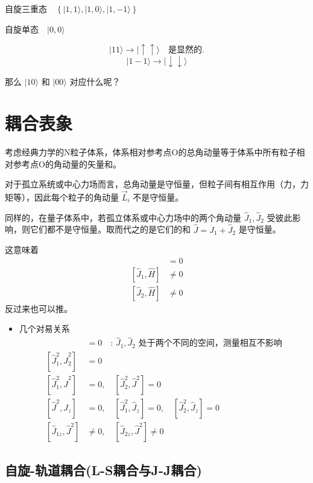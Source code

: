 \documentclass[lang=cn,10pt]{elegantbook}
\begin{document}
$\text{自旋三重态} \quad \left\{ |1, 1\rangle, |1, 0\rangle, |1, -1\rangle \right\}$

$\text{自旋单态} \quad |0, 0\rangle$

\[
|1 1\rangle \longrightarrow |\uparrow \uparrow\rangle \quad \text{是显然的.}
\]
\[
|1 -1\rangle \longrightarrow |\downarrow \downarrow\rangle
\]

那么 $|1 0\rangle$ 和 $|0 0\rangle$ 对应什么呢？
\section{耦合表象}
考虑经典力学的N粒子体系，体系相对参考点O的总角动量等于体系中所有粒子相对参考点O的角动量的矢量和。

对于孤立系统或中心力场而言，总角动量是守恒量，但粒子间有相互作用（力，力矩等），因此每个粒子的角动量 $\vec{L}_i$ 不是守恒量。

同样的，在量子体系中，若孤立体系或中心力场中的两个角动量 $\hat{J}_1, \hat{J}_2$ 受彼此影响，则它们都不是守恒量。取而代之的是它们的和 $\hat{J} = \hat{J}_1 + \hat{J}_2$ 是守恒量。

这意味着
\begin{align*}
	[\hat{J}, \hat{H}] &= 0 \\
	[\hat{J}_1, \hat{H}] &\neq 0 \\
	[\hat{J}_2, \hat{H}] &\neq 0
\end{align*}
反过来也可以推。

\begin{itemize}
	\item 几个对易关系
	\begin{align*}
		[\hat{J}_{1\alpha}, \hat{J}_{2\beta}] &= 0 \quad \text{: } \hat{J}_1, \hat{J}_2 \text{ 处于两个不同的空间，测量相互不影响} \\
		[\hat{J}_1^2, \hat{J}_2^2] &= 0 \\
		[\hat{J}_1^2, \hat{J}^2] &= 0,\quad [\hat{J}_2^2, \hat{J}^2] = 0 \\
		[\hat{J}^2, \hat{J}_z] &= 0,\quad [\hat{J}_1^2, \hat{J}_z] = 0,\quad [\hat{J}_2^2, \hat{J}_z] = 0 \\
		[\hat{J}_{1z}, \hat{J}^2] &\neq 0,\quad [\hat{J}_{2z}, \hat{J}^2] \neq 0
	\end{align*}
\end{itemize}

\subsection{自旋-轨道耦合(L-S耦合与J-J耦合)}
\end{document}
